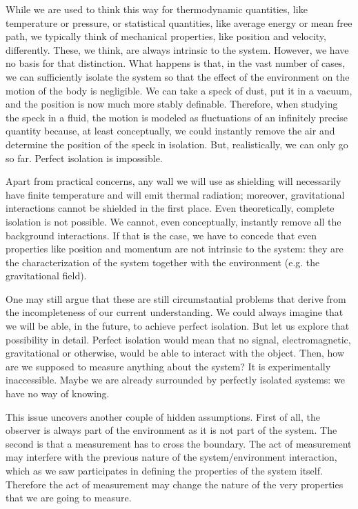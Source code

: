 \documentclass[10pt,twocolumn, nofootinbib]{revtex4-2}
\begin{document}
While we are used to think this way for thermodynamic quantities, like temperature or pressure, or statistical quantities, like average energy or mean free path, we typically think of mechanical properties, like position and velocity, differently. These, we think, are always intrinsic to the system. However, we have no basis for that distinction. What happens is that, in the vast number of cases, we can sufficiently isolate the system so that the effect of the environment on the motion of the body is negligible. We can take a speck of dust, put it in a vacuum, and the position is now much more stably definable. Therefore, when studying the speck in a fluid, the motion is modeled as fluctuations of an infinitely precise quantity because, at least conceptually, we could instantly remove the air and determine the position of the speck in isolation. But, realistically, we can only go so far. Perfect isolation is impossible.

Apart from practical concerns, any wall we will use as shielding will necessarily have finite temperature and will emit thermal radiation; moreover, gravitational interactions cannot be shielded in the first place. Even theoretically, complete isolation is not possible. We cannot, even conceptually, instantly remove all the background interactions. If that is the case, we have to concede that even properties like position and momentum are not intrinsic to the system: they are the characterization of the system together with the environment (e.g. the gravitational field).

One may still argue that these are still circumstantial problems that derive from the incompleteness of our current understanding. We could always imagine that we will be able, in the future, to achieve perfect isolation. But let us explore that possibility in detail. Perfect isolation would mean that no signal, electromagnetic, gravitational or otherwise, would be able to interact with the object. Then, how are we supposed to measure anything about the system? It is experimentally inaccessible. Maybe we are already surrounded by perfectly isolated systems: we have no way of knowing.

This issue uncovers another couple of hidden assumptions. First of all, the observer is always part of the environment as it is not part of the system. The second is that a measurement has to cross the boundary. The act of measurement may interfere with the previous nature of the system/environment interaction, which as we saw participates in defining the properties of the system itself. Therefore the act of measurement may change the nature of the very properties that we are going to measure.
\end{document}

